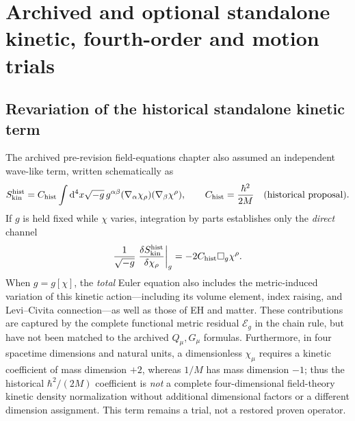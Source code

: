 \documentclass[11pt,a4paper]{article}
\newcommand{\dd}{\mathrm d}
\begin{document}
\appendix
\section{Archived and optional standalone kinetic, fourth-order and motion trials}\label{app:historical-operators}
\subsection{Revariation of the historical standalone kinetic term}
The archived pre-revision field-equations chapter also assumed an independent
wave-like term, written schematically as
\begin{equation}\label{eq:qgd052-old-kinetic}
 S_{\rm kin}^{\rm hist}=C_{\rm hist}\int\dd^4x\sqrt{-g}\,
 g^{\alpha\beta}(\nabla_\alpha\chi_\rho)(\nabla_\beta\chi^\rho),
 \qquad C_{\rm hist}=\frac{\hbar^2}{2M}\quad\text{(historical proposal)}.
\end{equation}
If $g$ is held fixed while $\chi$ varies, integration by parts
establishes only the \emph{direct} channel
\begin{equation}\label{eq:qgd052-old-kinetic-var}
 \frac1{\sqrt{-g}}\left.\frac{\delta S_{\rm kin}^{\rm hist}}
 {\delta\chi_\rho}\right|_g=-2C_{\rm hist}\square_g\chi^\rho.
\end{equation}
When $g=g[\chi]$, the \emph{total} Euler equation also includes the
metric-induced variation of this kinetic action---including its volume element,
index raising, and Levi--Civita connection---as well as those of EH and matter.
These contributions are captured by the complete functional metric residual
$\mathcal E_g$ in the chain rule, but have not been matched to the archived
$Q_\mu,G_\mu$ formulas.  Furthermore, in four spacetime dimensions and
natural units, a dimensionless $\chi_\mu$ requires a kinetic coefficient of
mass dimension $+2$, whereas $1/M$ has mass dimension $-1$; thus the
historical $\hbar^2/(2M)$ coefficient is \emph{not} a complete four-dimensional
field-theory kinetic density normalization without additional dimensional
factors or a different dimension assignment.  This term remains a trial, not a
restored proven operator.
\end{document}
